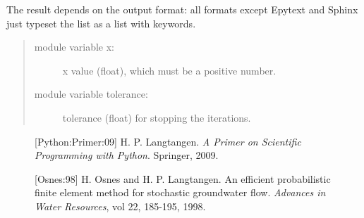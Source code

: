 \documentclass[a4paper]{article}
\begin{document}
The result depends on the output format: all formats except Epytext
and Sphinx just typeset the list as a list with keywords.
%
\begin{quote}
%
\begin{description}
\item[{module variable x:}] \leavevmode 
x value (float),
which must be a positive number.

\item[{module variable tolerance:}] \leavevmode 
tolerance (float) for stopping
the iterations.

\end{description}

\end{quote}
\begin{figure}[b][Python:Primer:09]
H. P. Langtangen.
\emph{A Primer on Scientific Programming with Python}.
Springer, 2009.
\end{figure}
\begin{figure}[b][Osnes:98]
H. Osnes and H. P. Langtangen.
An efficient probabilistic finite element method for stochastic
groundwater flow.
\emph{Advances in Water Resources}, vol 22, 185-195, 1998.
\end{figure}
\end{document}
